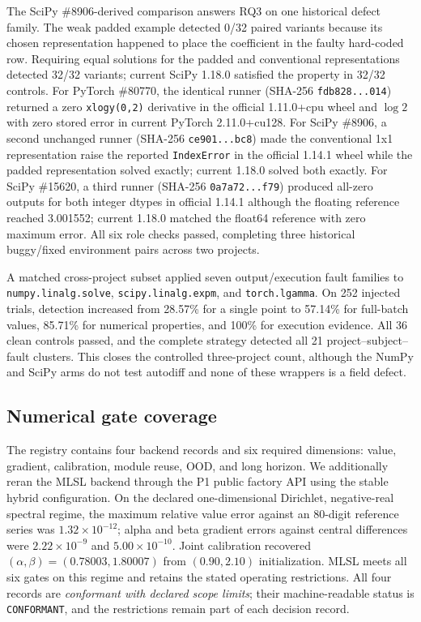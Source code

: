 \documentclass[preprint,12pt,authoryear]{elsarticle}
\begin{document}
The SciPy \#8906-derived comparison answers RQ3 on one historical defect family. The weak padded example detected 0/32 paired variants because its chosen representation happened to place the coefficient in the faulty hard-coded row. Requiring equal solutions for the padded and conventional representations detected 32/32 variants; current SciPy 1.18.0 satisfied the property in 32/32 controls. For PyTorch \#80770, the identical runner (SHA-256 \texttt{fdb828...014}) returned a zero \texttt{xlogy(0,2)} derivative in the official 1.11.0+cpu wheel and $\log 2$ with zero stored error in current PyTorch 2.11.0+cu128. For SciPy \#8906, a second unchanged runner (SHA-256 \texttt{ce901...bc8}) made the conventional 1x1 representation raise the reported \texttt{IndexError} in the official 1.14.1 wheel while the padded representation solved exactly; current 1.18.0 solved both exactly. For SciPy \#15620, a third runner (SHA-256 \texttt{0a7a72...f79}) produced all-zero outputs for both integer dtypes in official 1.14.1 although the floating reference reached 3.001552; current 1.18.0 matched the float64 reference with zero maximum error. All six role checks passed, completing three historical buggy/fixed environment pairs across two projects.

A matched cross-project subset applied seven output/execution fault families to \texttt{numpy.linalg.solve}, \texttt{scipy.linalg.expm}, and \texttt{torch.lgamma}. On 252 injected trials, detection increased from 28.57\% for a single point to 57.14\% for full-batch values, 85.71\% for numerical properties, and 100\% for execution evidence. All 36 clean controls passed, and the complete strategy detected all 21 project--subject--fault clusters. This closes the controlled three-project count, although the NumPy and SciPy arms do not test autodiff and none of these wrappers is a field defect.

\subsection{Numerical gate coverage}
The registry contains four backend records and six required dimensions: value, gradient, calibration, module reuse, OOD, and long horizon. We additionally reran the MLSL backend through the P1 public factory API using the stable hybrid configuration. On the declared one-dimensional Dirichlet, negative-real spectral regime, the maximum relative value error against an 80-digit reference series was $1.32\times10^{-12}$; alpha and beta gradient errors against central differences were $2.22\times10^{-9}$ and $5.00\times10^{-10}$. Joint calibration recovered $(\alpha,\beta)=(0.78003,1.80007)$ from $(0.90,2.10)$ initialization. MLSL meets all six gates on this regime and retains the stated operating restrictions. All four records are \emph{conformant with declared scope limits}; their machine-readable status is \texttt{CONFORMANT}, and the restrictions remain part of each decision record.
\end{document}
